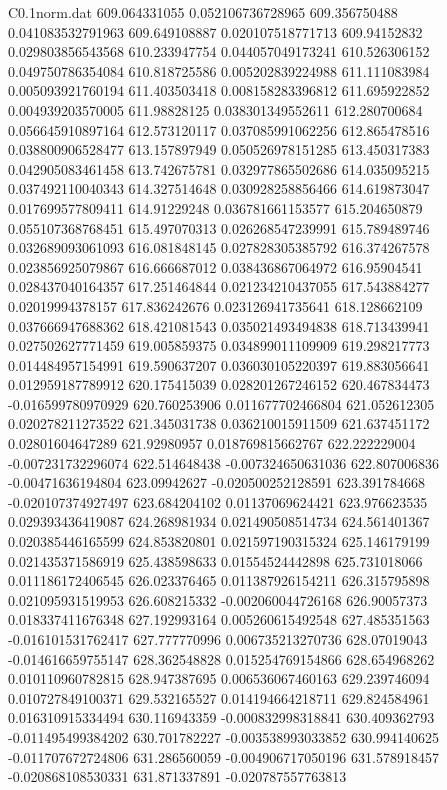 \begin{filecontents}{C0.1norm.dat}
609.064331055		0.052106736728965
609.356750488		0.041083532791963
609.649108887		0.020107518771713
609.94152832		0.029803856543568
610.233947754		0.044057049173241
610.526306152		0.049750786354084
610.818725586		0.005202839224988
611.111083984		0.005093921760194
611.403503418		0.008158283396812
611.695922852		0.004939203570005
611.98828125		0.038301349552611
612.280700684		0.056645910897164
612.573120117		0.037085991062256
612.865478516		0.038800906528477
613.157897949		0.050526978151285
613.450317383		0.042905083461458
613.742675781		0.032977865502686
614.035095215		0.037492110040343
614.327514648		0.030928258856466
614.619873047		0.017699577809411
614.91229248		0.036781661153577
615.204650879		0.055107368768451
615.497070313		0.026268547239991
615.789489746		0.032689093061093
616.081848145		0.027828305385792
616.374267578		0.023856925079867
616.666687012		0.038436867064972
616.95904541		0.028437040164357
617.251464844		0.021234210437055
617.543884277		0.02019994378157
617.836242676		0.023126941735641
618.128662109		0.037666947688362
618.421081543		0.035021493494838
618.713439941		0.027502627771459
619.005859375		0.034899011109909
619.298217773		0.014484957154991
619.590637207		0.036030105220397
619.883056641		0.012959187789912
620.175415039		0.028201267246152
620.467834473		-0.016599780970929
620.760253906		0.011677702466804
621.052612305		0.020278211273522
621.345031738		0.036210015911509
621.637451172		0.02801604647289
621.92980957		0.018769815662767
622.222229004		-0.007231732296074
622.514648438		-0.007324650631036
622.807006836		-0.00471636194804
623.09942627		-0.020500252128591
623.391784668		-0.020107374927497
623.684204102		0.01137069624421
623.976623535		0.029393436419087
624.268981934		0.021490508514734
624.561401367		0.020385446165599
624.853820801		0.021597190315324
625.146179199		0.021435371586919
625.438598633		0.01554524442898
625.731018066		0.011186172406545
626.023376465		0.011387926154211
626.315795898		0.021095931519953
626.608215332		-0.002060044726168
626.90057373		0.018337411676348
627.192993164		0.005260615492548
627.485351563		-0.016101531762417
627.777770996		0.006735213270736
628.07019043		-0.014616659755147
628.362548828		0.015254769154866
628.654968262		0.010110960782815
628.947387695		0.006536067460163
629.239746094		0.010727849100371
629.532165527		0.014194664218711
629.824584961		0.016310915334494
630.116943359		-0.000832998318841
630.409362793		-0.011495499384202
630.701782227		-0.003538993033852
630.994140625		-0.011707672724806
631.286560059		-0.004906717050196
631.578918457		-0.020868108530331
631.871337891		-0.020787557763813

\end{filecontents}
